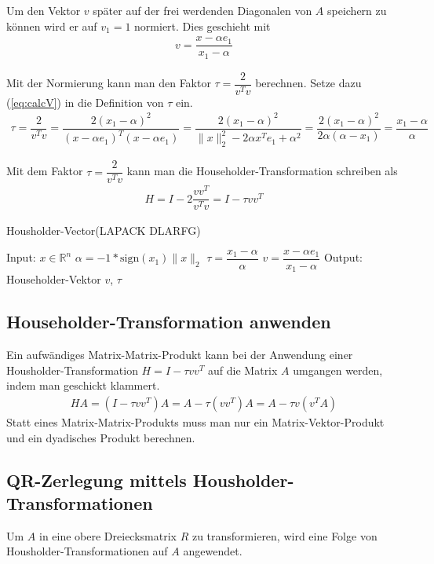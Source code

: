 Um den Vektor $v$ später auf der frei werdenden Diagonalen von $A$ speichern zu können wird er auf $v_1 = 1$ normiert. Dies geschieht mit 
\begin{align}
	v = \dfrac{x - \alpha e_1}{x_1 - \alpha}
	\label{eq:calcV}
\end{align}

Mit der Normierung kann man den Faktor $\tau = \dfrac{2}{v^Tv}$ berechnen. Setze dazu (\ref{eq:calcV}) in die Definition von $\tau$ ein.
\begin{align*}
	\tau = \dfrac{2}{v^Tv} = \dfrac{2 (x_1 - \alpha)^2}{(x - \alpha e_1)^T (x - \alpha e_1)} = \dfrac{2 (x_1 - \alpha)^2}{\|x\|^2_2 - 2\alpha x^Te_1 + \alpha^2} =  \dfrac{2 (x_1 - \alpha)^2}{ 2\alpha (\alpha - x_1)} = \dfrac{x_1 - \alpha}{\alpha}
\end{align*}

Mit dem Faktor $\tau = \dfrac{2}{v^Tv}$ kann man die Householder-Transformation schreiben als
\begin{align*}
	H = I - 2 \dfrac{vv^T}{v^Tv} = I - \tau v v^T
\end{align*}



\begin{algorithm}
	\caption{Housholder-Vector(LAPACK DLARFG)}
	\begin{algorithmic}
		\State Input: $x \in \mathbb{R}^n$ 
		\State $\alpha = -1 * \text{sign}(x_1) \|x\|_2$
		\State $\tau = \dfrac{x_1 - \alpha}{\alpha}$
		\State $v=\dfrac{x - \alpha e_1}{x_1 - \alpha}$
		\State Output: Householder-Vektor $v$, $\tau$
	\end{algorithmic} 
	\label{alg:unblockedqr}
\end{algorithm}


\subsection{Householder-Transformation anwenden}
Ein aufwändiges Matrix-Matrix-Produkt kann bei der Anwendung einer Housholder-Transformation $H = I - \tau vv^T$ auf die Matrix $A$ umgangen werden, indem man geschickt klammert.
\begin{align*} 
H A =(I - \tau vv^T) A= A - \tau (vv^T )A = A - \tau v(v^TA)
\end{align*}
Statt eines Matrix-Matrix-Produkts muss man nur ein Matrix-Vektor-Produkt und ein dyadisches Produkt berechnen.

\subsection{QR-Zerlegung mittels Housholder-Transformationen}
Um $A$ in eine obere Dreiecksmatrix $R$ zu transformieren, wird eine Folge von Housholder-Transformationen auf $A$ angewendet.

